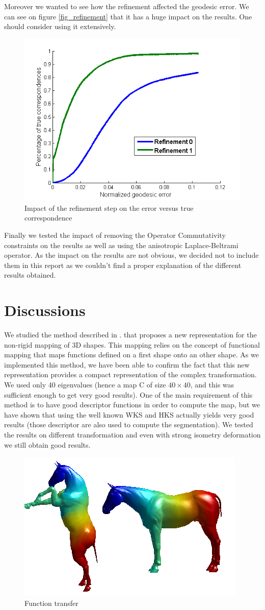 \documentclass[10pt,twocolumn,letterpaper]{article}
\begin{document}
Moreover we wanted to see how the refinement affected the geodesic error. We can see on figure \ref{fig_refinement} that it has a huge impact on the results. One should consider using it extensively.

\begin{figure}[h]
\centering
\includegraphics[width=.4\textwidth]{Images/refinement.png}
\caption{Impact of the refinement step on the error versus true correspondence}
\label{refinement}
\end{figure}

Finally we tested the impact of removing the Operator Commutativity constraints on the results as well as using the anisotropic Laplace-Beltrami operator. As the impact on the results are not obvious, we decided not to include them in this report as we couldn't find a proper explanation of the different results obtained.
 

\section{Discussions} %
We studied the method described in \cite{ovs}. that proposes a new representation for the non-rigid mapping of 3D shapes. This mapping relies on the concept of functional mapping that maps functions defined on a first shape onto an other shape. As we implemented this method, we have been able to confirm the fact that this new representation provides a compact representation of the complex transformation. We used only 40 eigenvalues (hence a map C of size $40\times40$, and this was sufficient enough to get very good results). One of the main requirement of this method is to have good descriptor functions in order to compute the map, but we have shown that using the well known WKS and HKS actually yields very good results (those descriptor are also used to compute the segmentation). We tested the results on different transformation and even with strong isometry deformation we still obtain good results.

\begin{figure}[h]
\centering
\includegraphics[width=.3\textwidth]{Images/full-constraints-iso1-3segments-horse.png}
\caption{Function transfer}
\label{refinement}
\end{figure}
\end{document}
